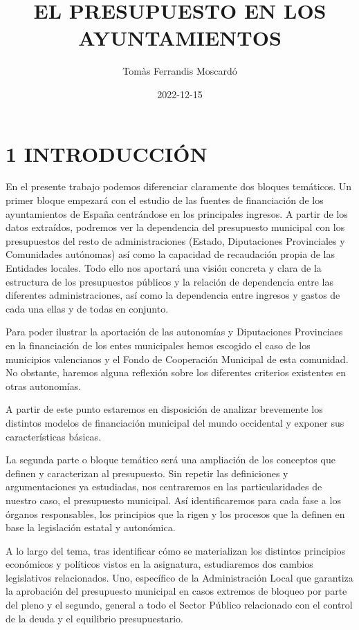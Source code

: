 \documentclass[
]{article}
\title{EL PRESUPUESTO EN LOS AYUNTAMIENTOS}
\author{Tomàs Ferrandis Moscardó}
\date{2022-12-15}
\begin{document}
\maketitle

{
\setcounter{tocdepth}{2}
\tableofcontents
}
\hypertarget{introducciuxf3n}{%
\section{1 INTRODUCCIÓN}\label{introducciuxf3n}}

En el presente trabajo podemos diferenciar claramente dos bloques
temáticos. Un primer bloque empezará con el estudio de las fuentes de
financiación de los ayuntamientos de España centrándose en los
principales ingresos. A partir de los datos extraídos, podremos ver la
dependencia del presupuesto municipal con los presupuestos del resto de
administraciones (Estado, Diputaciones Provinciales y Comunidades
autónomas) así como la capacidad de recaudación propia de las Entidades
locales. Todo ello nos aportará una visión concreta y clara de la
estructura de los presupuestos públicos y la relación de dependencia
entre las diferentes administraciones, así como la dependencia entre
ingresos y gastos de cada una ellas y de todas en conjunto.

Para poder ilustrar la aportación de las autonomías y Diputaciones
Provinciaes en la financiación de los entes municipales hemos escogido
el caso de los municipios valencianos y el Fondo de Cooperación
Municipal de esta comunidad. No obstante, haremos alguna reflexión sobre
los diferentes criterios existentes en otras autonomías.

A partir de este punto estaremos en disposición de analizar brevemente
los distintos modelos de financiación municipal del mundo occidental y
exponer sus características básicas.

La segunda parte o bloque temático será una ampliación de los conceptos
que definen y caracterizan al presupuesto. Sin repetir las definiciones
y argumentaciones ya estudiadas, nos centraremos en las particularidades
de nuestro caso, el presupuesto municipal. Así identificaremos para cada
fase a los órganos responsables, los principios que la rigen y los
procesos que la definen en base la legislación estatal y autonómica.

A lo largo del tema, tras identificar cómo se materializan los distintos
principios económicos y políticos vistos en la asignatura, estudiaremos
dos cambios legislativos relacionados. Uno, específico de la
Administración Local que garantiza la aprobación del presupuesto
municipal en casos extremos de bloqueo por parte del pleno y el segundo,
general a todo el Sector Público relacionado con el control de la deuda
y el equilibrio presupuestario.
\end{document}
